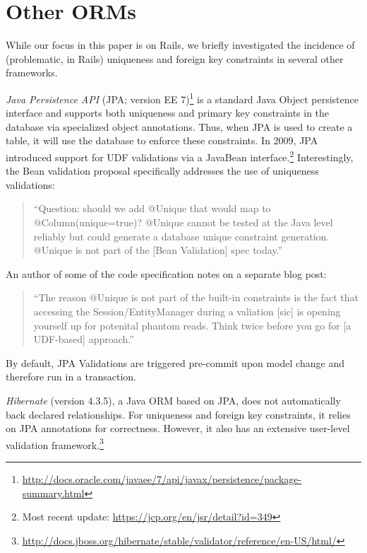 
\section{Other ORMs}
\label{sec:other-orms}

While our focus in this paper is on Rails, we briefly investigated the
incidence of (problematic, in Rails) uniqueness and foreign key
constraints in several other frameworks.

\newcommand{\orm}[1]{{\vspace{.45em}\noindent\textit{#1}}}

\orm{Java Persistence API}
(JPA; version EE 7)\footnote{\url{http://docs.oracle.com/javaee/7/api/javax/persistence/package-summary.html}}
is a standard Java Object persistence interface and supports both
uniqueness and primary key constraints in the database via specialized
object annotations. Thus, when JPA is used to create a table, it will
use the database to enforce these constraints. In 2009, JPA introduced
support for UDF validations via a JavaBean interface.\footnote{Most
  recent update: \url{https://jcp.org/en/jsr/detail?id=349}} Interestingly,
the Bean validation proposal specifically addresses the use of
uniqueness validations:
\begin{quote}
``Question: should we add @Unique that would map to @Column(unique=true)?
@Unique cannot be tested at the Java level reliably but could generate
a database unique constraint generation. @Unique is not part
of the [Bean Validation] spec today.''~\cite{jsr-bean}
\end{quote}
An author of some of the code specification notes on a separate blog
post:
\begin{quote}
  ``The reason @Unique is not part of the built-in constraints is the
  fact that accessing the Session/EntityManager during a valiation
  [sic] is opening yourself up for potenital phantom reads. Think
  twice before you go for [a UDF-based] approach.''~\cite{unique-bean}
\end{quote}
By default, JPA Validations are triggered pre-commit upon model
change and therefore run in a transaction.

\orm{Hibernate} (version 4.3.5), a Java ORM based on JPA, does
not automatically back declared relationships. For uniqueness and
foreign key constraints, it relies on JPA annotations for
correctness. However, it also has an extensive user-level validation
framework.\footnote{\url{http://docs.jboss.org/hibernate/stable/validator/reference/en-US/html/}}

